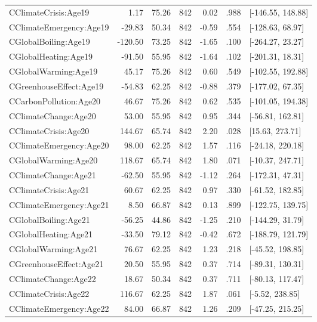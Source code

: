 \begin{table}[ht]
\begin{tabular}{lrrrrrl}
  CClimateCrisis:Age19 & 1.17 & 75.26 & 842 & 0.02 & .988 & [-146.55, 148.88] \\ 
  CClimateEmergency:Age19 & -29.83 & 50.34 & 842 & -0.59 & .554 & [-128.63, 68.97] \\ 
  CGlobalBoiling:Age19 & -120.50 & 73.25 & 842 & -1.65 & .100 & [-264.27, 23.27] \\ 
  CGlobalHeating:Age19 & -91.50 & 55.95 & 842 & -1.64 & .102 & [-201.31, 18.31] \\ 
  CGlobalWarming:Age19 & 45.17 & 75.26 & 842 & 0.60 & .549 & [-102.55, 192.88] \\ 
  CGreenhouseEffect:Age19 & -54.83 & 62.25 & 842 & -0.88 & .379 & [-177.02, 67.35] \\ 
  CCarbonPollution:Age20 & 46.67 & 75.26 & 842 & 0.62 & .535 & [-101.05, 194.38] \\ 
  CClimateChange:Age20 & 53.00 & 55.95 & 842 & 0.95 & .344 & [-56.81, 162.81] \\ 
  CClimateCrisis:Age20 & 144.67 & 65.74 & 842 & 2.20 & .028 & [15.63, 273.71] \\ 
  CClimateEmergency:Age20 & 98.00 & 62.25 & 842 & 1.57 & .116 & [-24.18, 220.18] \\ 
  CGlobalWarming:Age20 & 118.67 & 65.74 & 842 & 1.80 & .071 & [-10.37, 247.71] \\ 
  CClimateChange:Age21 & -62.50 & 55.95 & 842 & -1.12 & .264 & [-172.31, 47.31] \\ 
  CClimateCrisis:Age21 & 60.67 & 62.25 & 842 & 0.97 & .330 & [-61.52, 182.85] \\ 
  CClimateEmergency:Age21 & 8.50 & 66.87 & 842 & 0.13 & .899 & [-122.75, 139.75] \\ 
  CGlobalBoiling:Age21 & -56.25 & 44.86 & 842 & -1.25 & .210 & [-144.29, 31.79] \\ 
  CGlobalHeating:Age21 & -33.50 & 79.12 & 842 & -0.42 & .672 & [-188.79, 121.79] \\ 
  CGlobalWarming:Age21 & 76.67 & 62.25 & 842 & 1.23 & .218 & [-45.52, 198.85] \\ 
  CGreenhouseEffect:Age21 & 20.50 & 55.95 & 842 & 0.37 & .714 & [-89.31, 130.31] \\ 
  CClimateChange:Age22 & 18.67 & 50.34 & 842 & 0.37 & .711 & [-80.13, 117.47] \\ 
  CClimateCrisis:Age22 & 116.67 & 62.25 & 842 & 1.87 & .061 & [-5.52, 238.85] \\ 
  CClimateEmergency:Age22 & 84.00 & 66.87 & 842 & 1.26 & .209 & [-47.25, 215.25] \\ 

\end{tabular}
\end{table}
